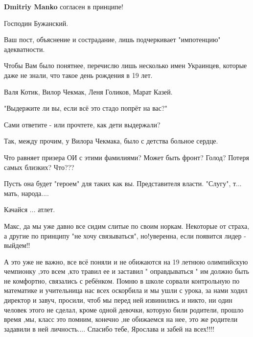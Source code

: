 \begin{itemize}
\begin{itemize}
 
\textbf{Dmitriy Manko} согласен в принципе!
\end{itemize}

 

Господин Бужанский.

Ваш пост, объяснение и сострадание, лишь подчеркивает "импотенцию"
адекватности.

Чтобы Вам было понятнее, перечислю лишь несколько имен Украинцев, которые даже
не знали, что такое день рождения в 19 лет.

Валя Котик, Вилор Чекмак, Леня Голиков, Марат Казей.

"Выдержите ли вы, если всё это стадо попрёт на вас?"

Сами ответите - или прочтете, как дети выдержали?

Так, между прочим, у Вилора Чекмака, было с детства больное сердце.

Что равняет призера ОИ с этими фамилиями? Может быть фронт? Голод? Потеря самых
близких? Что???

Пусть она будет "героем" для таких как вы. Представителя власти. "Слугу", т...
мать, народа....

Качайся ... атлет.


Макс, да мы уже давно все сидим слитые по своим норкам. Некоторые от страха, а
другие по принципу "не хочу связываться", но!уверенна, если появится лидер -
выйдем!!


 

А это уже не важно, все всё поняли и не обижаются на 19 летнюю олимпийскую
чемпионку ,это всем ,кто травил ее и заставил " оправдываться " им должно быть
не комфортно, связались с ребёнком. Помню в школе сорвали контрольную по
математике и учительница нас всех оскорбила и мы ушли с урока, за нами ходил
директор и завуч, просили, чтоб мы перед ней извинились и никто, ни один человек
этого не сделал, кроме одной девочки, которую били родители, прошло время
,мы, класс это помним, конечно ,не обижаемся на нее, это же родители задавили в
ней личность.... Спасибо тебе, Ярослава и забей на всех!!!!


\end{itemize}
